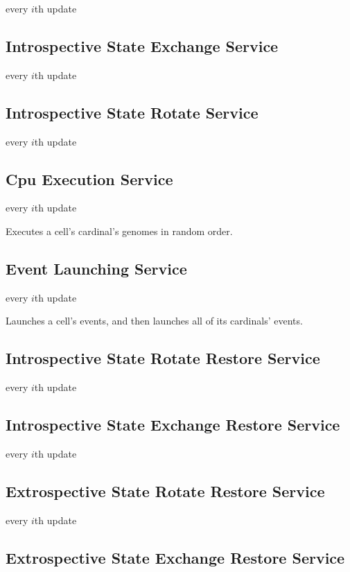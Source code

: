every $i$th update

\subsection{Introspective State Exchange Service}

every $i$th update

\subsection{Introspective State Rotate Service}

every $i$th update

\subsection{Cpu Execution Service}

every $i$th update

Executes a cell's cardinal's genomes in random order.

\subsection{Event Launching Service}

every $i$th update

Launches a cell's events, and then launches all of its cardinals' events.

\subsection{Introspective State Rotate Restore Service}

every $i$th update

\subsection{Introspective State Exchange Restore Service}

every $i$th update

\subsection{Extrospective State Rotate Restore Service}

every $i$th update

\subsection{Extrospective State Exchange Restore Service}

